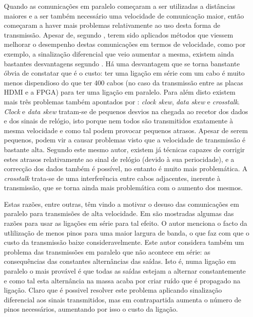 Quando as comunicações em paralelo começaram a ser utilizadas a distâncias maiores e a ser também necessário uma velocidade de comunicação maior, então começaram a haver mais problemas relativamente ao uso desta forma de transmissão. Apesar de, segundo \cite{R032}, terem sido aplicados métodos que viessem melhorar o desempenho destas comunicações em termos de velocidade, como por exemplo, a sinalização diferencial que veio aumentar a mesma, existem ainda bastantes desvantagens segundo \cite{R012}. Há uma  desvantagem que se torna banstante óbvia de constatar que é o custo: ter uma ligação em série com um cabo é muito menos dispendioso do que ter 400 cabos (no caso da transmissão entre as placas HDMI e a FPGA) para ter uma ligação em paralelo. Para além disto existem mais três problemas também apontados por \cite{R012} : \textit{clock skew}, \textit{data skew} e \textit{crosstalk}. \textit{Clock} e \textit{data skew} tratam-se de pequenos desvios na chegada ao recetor dos dados e dos sinais de relógio, isto porque nem todos são transmitidos exatamente à mesma velocidade e como tal podem provocar pequenos atrasos. Apesar de serem pequenos, podem vir a causar problemas visto que a velocidade de transmissão é bastante alta. Segundo este mesmo autor, existem já técnicas capazes de corrigir estes atrasos relativamente ao sinal de relógio (devido à sua periocidade), e a correcção dos dados também é possível, no entanto é muito mais problemática. A \textit{crosstalk} trata-se de uma interferência entre cabos adjacentes, inerente à transmissão, que se torna ainda mais problemática com o aumento dos mesmos.

Estas razões, entre outras, têm vindo a motivar o desuso das comunicações em paralelo para transmisões de alta velocidade. Em \cite{R032} são mostradas algumas das razões para usar as ligações em série para tal efeito. O autor menciona o facto da utlilização de menos pinos para uma maior largura de banda, o que faz com que o custo da transmissão baixe consideravelmente. Este autor considera também um problema das transmissões em paralelo que não acontece em série: as consequências das constantes alternâncias das saídas. Isto é, numa ligação em paralelo o mais provável é que todas as saídas estejam a alternar constantemente e como tal esta alternância na massa acaba por criar ruído que é propagado na ligação. Claro que é possivel resolver este problema aplicando sinalização diferencial aos sinais transmitidos, mas em contrapartida aumenta o número de pinos necessários, aumentando por isso o custo da ligação.

